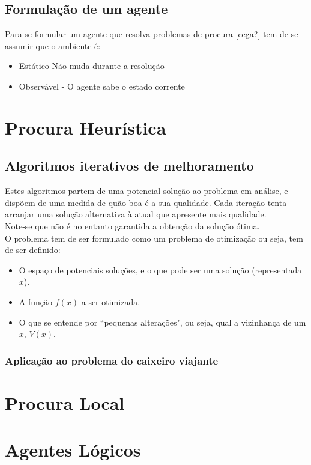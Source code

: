 \documentclass[]{report}
\begin{document}
\section{Formulação de um agente}
Para se formular um agente que resolva problemas de procura [cega?] tem de se assumir que o ambiente é:
\begin{itemize}
\item Estático
Não muda durante a resolução
\item Observável - O agente sabe o estado corrente
\end{itemize}
\chapter{Procura Heurística}
\section{Algoritmos iterativos de melhoramento}
Estes algoritmos partem de uma potencial solução ao problema em análise, e dispõem de uma medida de quão boa é a sua qualidade. Cada iteração tenta arranjar uma solução alternativa à atual que apresente mais qualidade.\\
Note-se que não é no entanto garantida a obtenção da solução ótima.\\[0.5cm]
O problema tem de ser formulado como um problema de otimização ou seja, tem de ser definido:
\begin{itemize}
\item O espaço de potenciais soluções, e o que pode ser uma solução (representada $x$).
\item A função $f(x)$ a ser otimizada.
\item O que se entende por ``pequenas alterações", ou seja, qual a vizinhança de um $x$, $V(x)$.
\end{itemize}
\subsection{Aplicação ao problema do caixeiro viajante}
\chapter{Procura Local}
\chapter{Agentes Lógicos}
\end{document}
